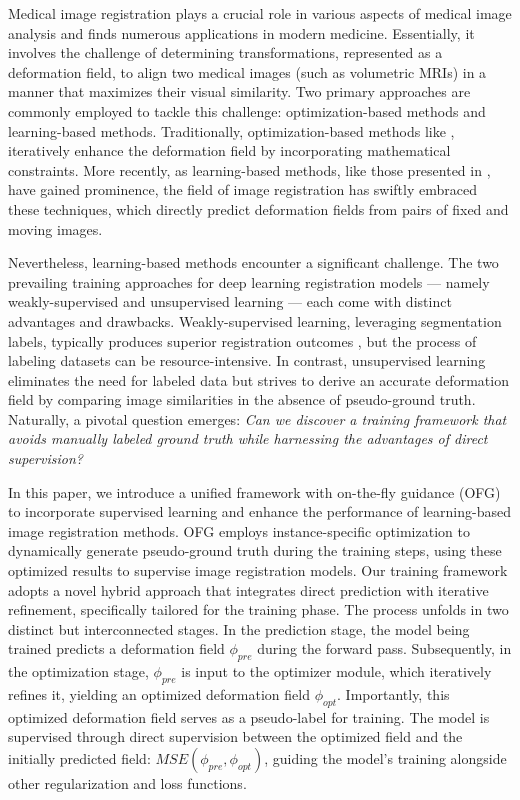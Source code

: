 \documentclass[10pt,twocolumn,letterpaper]{article}
\begin{document}
Medical image registration plays a crucial role in various aspects of medical image analysis and finds numerous applications in modern medicine. Essentially, it involves the challenge of determining transformations, represented as a deformation field, to align two medical images (such as volumetric MRIs) in a manner that maximizes their visual similarity. Two primary approaches are commonly employed to tackle this challenge: optimization-based methods and learning-based methods. Traditionally, optimization-based methods like \cite{AVANTS200826, BAJCSY19891, 1175091}, iteratively enhance the deformation field by incorporating mathematical constraints. More recently, as learning-based methods, like those presented in \cite{Chen_2022, chen2021vitvnet}, have gained prominence, the field of image registration has swiftly embraced these techniques, which directly predict deformation fields from pairs of fixed and moving images.



Nevertheless, learning-based methods encounter a significant challenge. The two prevailing training approaches for deep learning registration models — namely weakly-supervised and unsupervised learning — each come with distinct advantages and drawbacks. Weakly-supervised learning, leveraging segmentation labels, typically produces superior registration outcomes \cite{Balakrishnan_2019}, but the process of labeling datasets can be resource-intensive. In contrast, unsupervised learning eliminates the need for labeled data but strives to derive an accurate deformation field by comparing image similarities in the absence of pseudo-ground truth. Naturally, a pivotal question emerges: \textit{Can we discover a training framework that avoids manually labeled ground truth while harnessing the advantages of direct supervision?}

In this paper, we introduce a unified framework with on-the-fly guidance (OFG) to incorporate supervised learning and enhance the performance of learning-based image registration methods. OFG employs instance-specific optimization to dynamically generate pseudo-ground truth during the training steps, using these optimized results to supervise image registration models. Our training framework adopts a novel hybrid approach that integrates direct prediction with iterative refinement, specifically tailored for the training phase. The process unfolds in two distinct but interconnected stages. In the prediction stage, the model being trained predicts a deformation field $\phi_{pre}$ during the forward pass. Subsequently, in the optimization stage, $\phi_{pre}$ is input to the optimizer module, which iteratively refines it, yielding an optimized deformation field $\phi_{opt}$. Importantly, this optimized deformation field serves as a pseudo-label for training. The model is supervised through direct supervision between the optimized field and the initially predicted field: $MSE(\phi_{pre}, \phi_{opt})$, guiding the model's training alongside other regularization and loss functions.
\end{document}
